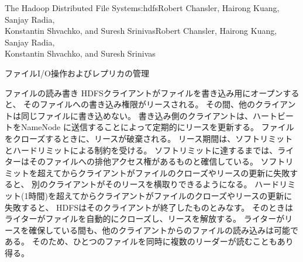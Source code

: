 \begin{aosachaptertoc}{The Hadoop Distributed File System}{s:hdfs}{Robert Chansler, Hairong Kuang, Sanjay Radia, \\ Konstantin Shvachko, and Suresh Srinivas}{Robert Chansler, Hairong Kuang, Sanjay Radia, \\ \hspace*{0.9cm} Konstantin Shvachko, and Suresh Srinivas}
\begin{aosasect1}{ファイルI/O操作およびレプリカの管理}
\begin{aosasect2}{ファイルの読み書き}
HDFSクライアントがファイルを書き込み用にオープンすると、
そのファイルへの書き込み権限がリースされる。
その間、他のクライアントは同じファイルに書き込めない。
書き込み側のクライアントは、ハートビートをNameNode
に送信することによって定期的にリースを更新する。
ファイルをクローズするときに、リースが破棄される。
リース期間は、ソフトリミットとハードリミットによる制約を受ける。
ソフトリミットに達するまでは、ライターはそのファイルへの排他アクセス権があるものと確信している。
ソフトリミットを超えてからクライアントがファイルのクローズやリースの更新に失敗すると、
別のクライアントがそのリースを横取りできるようになる。
ハードリミット(1時間)を超えてからクライアントがファイルのクローズやリースの更新に失敗すると、
HDFSはそのクライアントが終了したものとみなす。
そのときはライターがファイルを自動的にクローズし、リースを解放する。
ライターがリースを確保している間も、他のクライアントからのファイルの読み込みは可能である。
そのため、ひとつのファイルを同時に複数のリーダーが読むこともあり得る。


\end{aosasect2}
\end{aosasect1}
\end{aosachaptertoc}
